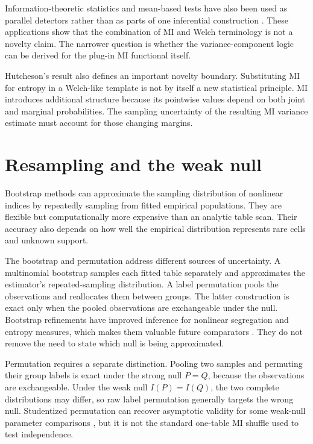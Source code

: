 Information-theoretic statistics and mean-based tests have also been used as
parallel detectors rather than as parts of one inferential construction
\citep{mather2013}. These applications show that the combination of MI and
Welch terminology is not a novelty claim. The narrower question is whether the
variance-component logic can be derived for the plug-in MI functional itself.

Hutcheson's result also defines an important novelty boundary. Substituting MI
for entropy in a Welch-like template is not by itself a new statistical
principle. MI introduces additional structure because its pointwise values
depend on both joint and marginal probabilities. The sampling uncertainty of
the resulting MI variance estimate must account for those changing margins.

\section{Resampling and the weak null}

Bootstrap methods can approximate the sampling distribution of nonlinear
indices by repeatedly sampling from fitted empirical populations. They are
flexible but computationally more expensive than an analytic table scan.
Their accuracy also depends on how well the empirical distribution represents
rare cells and unknown support.

The bootstrap and permutation address different sources of uncertainty. A
multinomial bootstrap samples each fitted table separately and approximates
the estimator's repeated-sampling distribution. A label permutation pools the
observations and reallocates them between groups. The latter construction is
exact only when the pooled observations are exchangeable under the null.
Bootstrap refinements have improved inference for nonlinear segregation and
entropy measures, which makes them valuable future comparators
\citep{allen2015,palma2022}. They do not remove the need to state which null is
being approximated.

Permutation requires a separate distinction. Pooling two samples and
permuting their group labels is exact under the strong null \(P=Q\), because
the observations are exchangeable. Under the weak null \(I(P)=I(Q)\), the two
complete distributions may differ, so raw label permutation generally targets
the wrong null. Studentized permutation can recover asymptotic validity for
some weak-null parameter comparisons \citep{chung2013}, but it is not the
standard one-table MI shuffle used to test independence.

